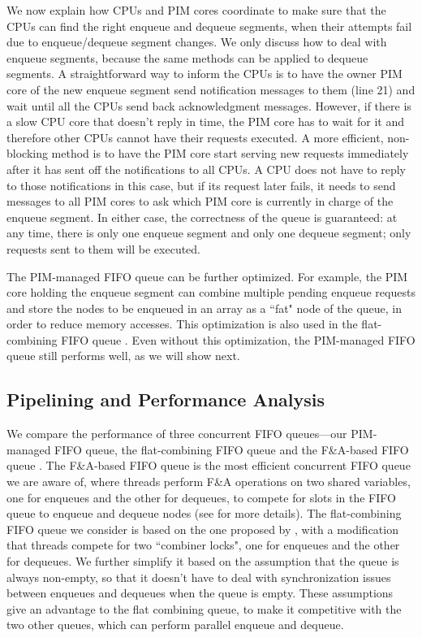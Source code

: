 We now explain how CPUs and PIM cores coordinate to make sure that the CPUs can find the right enqueue 
and dequeue segments, when their attempts fail due to enqueue/dequeue segment changes. 
We only discuss how to deal with enqueue segments, 
because the same methods can be applied to dequeue segments. 
A straightforward way to inform the CPUs is to have the owner PIM core of the new enqueue segment 
send notification messages to them (line 21) 
and wait until all the CPUs send back acknowledgment messages. 
However, if there is a slow CPU core that doesn't reply in time, 
the PIM core has to wait for it and therefore other CPUs cannot have their requests executed. 
A more efficient, non-blocking method is to have the PIM core start serving new requests 
immediately after it has sent off the notifications to all CPUs. 
A CPU does not have to reply to those notifications in this case, 
but if its request later fails, it needs to send messages to all PIM cores 
to ask which PIM core is currently in charge of the enqueue segment.
In either case, the correctness of the queue is guaranteed:  
at any time, there is only one enqueue segment and only one dequeue segment; 
only requests sent to them will be executed. 
  
The PIM-managed FIFO queue can be further optimized. 
For example, the PIM core holding the enqueue segment can combine multiple pending enqueue requests 
and store the nodes to be enqueued in an array as a ``fat" node of the queue, 
in order to reduce memory accesses. 
This optimization is also used in the flat-combining FIFO queue \cite{Hendler10}. 
Even without this optimization, the PIM-managed FIFO queue still performs well, as we will show next. 

\subsection{Pipelining and Performance Analysis}
We compare the performance of three concurrent FIFO queues---our PIM-managed FIFO queue, 
the flat-combining FIFO queue and the F\&A-based FIFO queue \cite{Morrison13}. 
The F\&A-based FIFO queue is the most efficient concurrent FIFO queue we are aware of, 
where threads perform F\&A operations on two shared variables, 
one for enqueues and the other for dequeues, to compete for slots in the FIFO queue to 
enqueue and dequeue nodes (see \cite{Morrison13} for more details). 
The flat-combining FIFO queue we consider is based on the one proposed by \cite{Hendler10}, 
with a modification that threads compete for two ``combiner locks", 
one for enqueues and the other for dequeues. 
We further simplify it based on the assumption that the queue is always non-empty, 
so that it doesn't have to deal with synchronization issues between enqueues and dequeues 
when the queue is empty. These assumptions give an advantage to the flat combining queue, 
to make it competitive with the two other queues, which can perform parallel enqueue and dequeue. 

